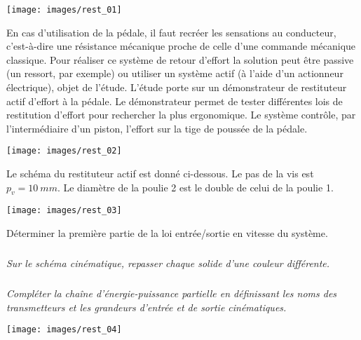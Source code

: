 \documentclass[10pt,fleqn]{article} %
\begin{document}
\begin{multicols}{2}
\begin{multicols}{2}
\begin{center}
\texttt{[image: images/rest\_01]}
\end{center}


En cas d’utilisation de la pédale, il faut recréer les sensations
au conducteur, c'est-à-dire une résistance mécanique proche
de celle d’une commande mécanique classique. Pour réaliser
ce système de retour d’effort la solution peut être passive (un
ressort, par exemple) ou utiliser un système actif (à l’aide d’un
actionneur électrique), objet de l’étude.
L’étude porte sur un démonstrateur de restituteur actif
d’effort à la pédale. Le démonstrateur permet de tester
différentes lois de restitution d’effort pour rechercher la plus
ergonomique. Le système contrôle, par l’intermédiaire d’un
piston, l’effort sur la tige de poussée de la pédale.


\begin{center}
\texttt{[image: images/rest\_02]}
\end{center}

Le schéma du restituteur actif est donné ci-dessous. Le pas de la vis est $p_v =\SI{10}{mm}$.
Le diamètre de la poulie 2 est le double de celui de la poulie 1. 


\begin{center}
\texttt{[image: images/rest\_03]}
\end{center}

\begin{obj}
Déterminer la première partie
de la loi entrée/sortie en vitesse du
système.
\end{obj}

\subparagraph{}
\textit{Sur le schéma cinématique, repasser chaque solide d’une couleur différente.}

\ifprof
\begin{corrige}
\end{corrige}
\else
\fi

\subparagraph{}
\textit{Compléter la chaîne d’énergie-puissance partielle en définissant les noms des transmetteurs et les grandeurs
d’entrée et de sortie cinématiques.}

\ifprof
\begin{corrige}
\end{corrige}
\else
\fi



\begin{center}
\texttt{[image: images/rest\_04]}
\end{center}


\end{multicols}
\end{multicols}
\end{document}
